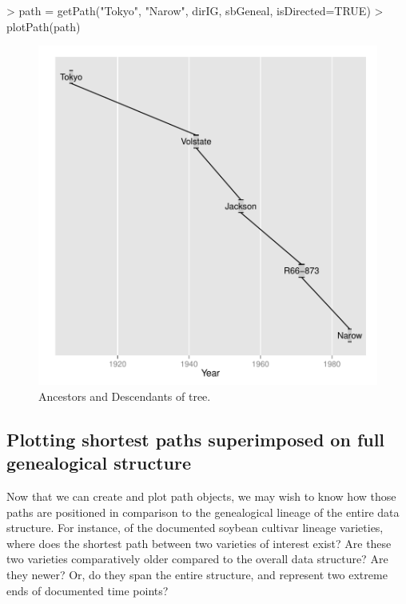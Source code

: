 \documentclass{article}
\numberwithin{equation}{section} %
\begin{document}
\begin{Schunk}
\begin{Sinput}
> path = getPath("Tokyo", "Narow", dirIG, sbGeneal, isDirected=TRUE)
> plotPath(path)
\end{Sinput}
\end{Schunk}

\begin{figure} 
  \begin{center} 
\includegraphics{ggenealogy-plotPath3}
\end{center} 
\caption{Ancestors and Descendants of tree.}
\label{fig:plotPath3}
\end{figure}

\subsection{Plotting shortest paths superimposed on full genealogical structure}

Now that we can create and plot path objects, we may wish to know how those paths are positioned in comparison to the genealogical lineage of the entire data structure. For instance, of the documented soybean cultivar lineage varieties, where does the shortest path between two varieties of interest exist? Are these two varieties comparatively older compared to the overall data structure? Are they newer? Or, do they span the entire structure, and represent two extreme ends of documented time points?
\end{document}
